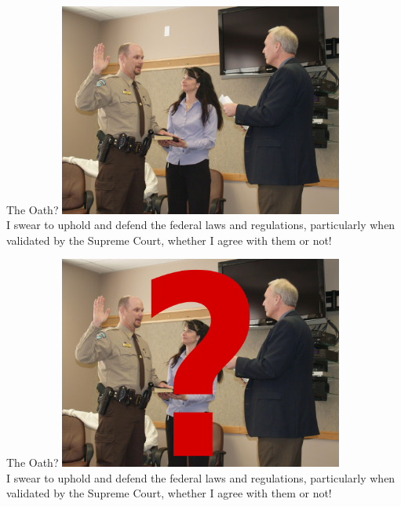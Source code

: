 \documentclass{beamer}
\begin{document}
\begin{frame}{The Oath?}
    \centering
    \includegraphics[width=0.7\textwidth]{img/oath.jpg} \\
    I swear to uphold and defend the federal laws and regulations, particularly when validated by the Supreme Court, whether I agree with them or not!
\end{frame}

\begin{frame}{The Oath?}
    \centering
    \includegraphics[width=0.7\textwidth]{img/oath-q.png} \\
    I swear to uphold and defend the federal laws and regulations, particularly when validated by the Supreme Court, whether I agree with them or not!
\end{frame}
\end{document}
